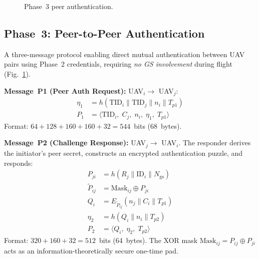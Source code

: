 \documentclass[conference]{IEEEtran}
\begin{document}
\begin{figure}[H]
\centering
{}
\caption{Phase~3 peer authentication.}
\label{fig:phase3}
\end{figure}

\subsection{Phase~3: Peer-to-Peer Authentication}
A three-message protocol enabling direct mutual authentication between UAV pairs using Phase~2 credentials, requiring \emph{no GS involvement} during flight (Fig.~\ref{fig:phase3}).

\textbf{Message~P1 (Peer Auth Request):} UAV$_i \to$ UAV$_j$:
\begin{align}
\eta_1 &= h(\text{TID}_i \| \text{TID}_j \| n_i \| T_{p1}) \label{eq:p1_mac}\\
P_1 &= \langle \text{TID}_i,\; C_j,\; n_i,\; \eta_1,\; T_{p1} \rangle \label{eq:p1}
\end{align}
Format: $64 + 128 + 160 + 160 + 32 = 544$~bits (68~bytes).

\textbf{Message~P2 (Challenge Response):} UAV$_j \to$ UAV$_i$. The responder derives the initiator's peer secret, constructs an encrypted authentication puzzle, and responds:
\begin{align}
P_{ji} &= h(R_j \| \text{ID}_i \| N_{\text{gs}}) \label{eq:p2_secret}\\
\tilde{P}_{ij} &= \text{Mask}_{ij} \oplus P_{ji} \label{eq:p2_recover}\\
Q_i &= E_{\tilde{P}_{ij}}(n_j \| C_i \| T_{p1}) \label{eq:puzzle}\\
\eta_2 &= h(Q_i \| n_i \| T_{p2}) \label{eq:p2_mac}\\
P_2 &= \langle Q_i,\; \eta_2,\; T_{p2} \rangle \label{eq:p2}
\end{align}
Format: $320 + 160 + 32 = 512$~bits (64~bytes). The XOR mask $\text{Mask}_{ij} = P_{ij} \oplus P_{ji}$ acts as an information-theoretically secure one-time pad.
\end{document}
